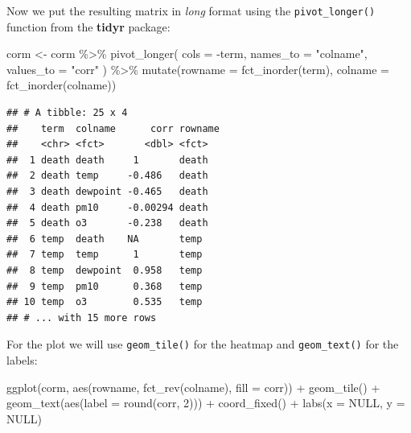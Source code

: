 \documentclass[
]{krantz}
\makeatletter
\newenvironment{Shaded}{\begin{snugshade}}{\end{snugshade}}
\newcommand{\AttributeTok}[1]{\textcolor[rgb]{0.61,0.61,0.61}{#1}}
\newcommand{\ConstantTok}[1]{\textcolor[rgb]{0,0,0}{#1}}
\newcommand{\DecValTok}[1]{\textcolor[rgb]{0.06,0.06,0.06}{#1}}
\newcommand{\FunctionTok}[1]{\textcolor[rgb]{0,0,0}{#1}}
\newcommand{\NormalTok}[1]{#1}
\newcommand{\OtherTok}[1]{\textcolor[rgb]{0.37,0.37,0.37}{#1}}
\newcommand{\SpecialCharTok}[1]{\textcolor[rgb]{0,0,0}{#1}}
\newcommand{\StringTok}[1]{\textcolor[rgb]{0.5,0.5,0.5}{#1}}
\newenvironment{kframe}{%
\medskip{}
\setlength{\fboxsep}{.8em}
 \def\at@end@of@kframe{}%
 \ifinner\ifhmode%
  \def\at@end@of@kframe{\end{minipage}}%
  \begin{minipage}{\columnwidth}%
 \fi\fi%
 \def\FrameCommand##1{\hskip\@totalleftmargin \hskip-\fboxsep
 \colorbox{shadecolor}{##1}\hskip-\fboxsep
     \hskip-\linewidth \hskip-\@totalleftmargin \hskip\columnwidth}%
 \MakeFramed {\advance\hsize-\width
   \@totalleftmargin\z@ \linewidth\hsize
   \@setminipage}}%
 {\par\unskip\endMakeFramed%
 \at@end@of@kframe}
\renewenvironment{Shaded}{\begin{kframe}}{\end{kframe}}
\makeatother
\begin{document}
Now we put the resulting matrix in \emph{long} format using the \texttt{pivot\_longer()} function from the \textbf{tidyr} package:

\begin{Shaded}
\begin{Highlighting}[]
\NormalTok{corm }\OtherTok{\textless{}{-}}\NormalTok{ corm }\SpecialCharTok{\%\textgreater{}\%}
  \FunctionTok{pivot\_longer}\NormalTok{(}
    \AttributeTok{cols =} \SpecialCharTok{{-}}\NormalTok{term,}
    \AttributeTok{names\_to =} \StringTok{"colname"}\NormalTok{,}
    \AttributeTok{values\_to =} \StringTok{"corr"}
\NormalTok{  ) }\SpecialCharTok{\%\textgreater{}\%}
  \FunctionTok{mutate}\NormalTok{(}\AttributeTok{rowname =} \FunctionTok{fct\_inorder}\NormalTok{(term),}
         \AttributeTok{colname =} \FunctionTok{fct\_inorder}\NormalTok{(colname))}
\end{Highlighting}
\end{Shaded}

\begin{verbatim}
## # A tibble: 25 x 4
##    term  colname      corr rowname
##    <chr> <fct>       <dbl> <fct>  
##  1 death death     1       death  
##  2 death temp     -0.486   death  
##  3 death dewpoint -0.465   death  
##  4 death pm10     -0.00294 death  
##  5 death o3       -0.238   death  
##  6 temp  death    NA       temp   
##  7 temp  temp      1       temp   
##  8 temp  dewpoint  0.958   temp   
##  9 temp  pm10      0.368   temp   
## 10 temp  o3        0.535   temp   
## # ... with 15 more rows
\end{verbatim}

For the plot we will use \texttt{geom\_tile()} for the heatmap and \texttt{geom\_text()} for the labels:

\begin{Shaded}
\begin{Highlighting}[]
\FunctionTok{ggplot}\NormalTok{(corm, }\FunctionTok{aes}\NormalTok{(rowname, }\FunctionTok{fct\_rev}\NormalTok{(colname),}
                 \AttributeTok{fill =}\NormalTok{ corr)) }\SpecialCharTok{+}
  \FunctionTok{geom\_tile}\NormalTok{() }\SpecialCharTok{+}
  \FunctionTok{geom\_text}\NormalTok{(}\FunctionTok{aes}\NormalTok{(}\AttributeTok{label =} \FunctionTok{round}\NormalTok{(corr, }\DecValTok{2}\NormalTok{))) }\SpecialCharTok{+}
  \FunctionTok{coord\_fixed}\NormalTok{() }\SpecialCharTok{+}
  \FunctionTok{labs}\NormalTok{(}\AttributeTok{x =} \ConstantTok{NULL}\NormalTok{, }\AttributeTok{y =} \ConstantTok{NULL}\NormalTok{)}
\end{Highlighting}
\end{Shaded}
\end{document}
